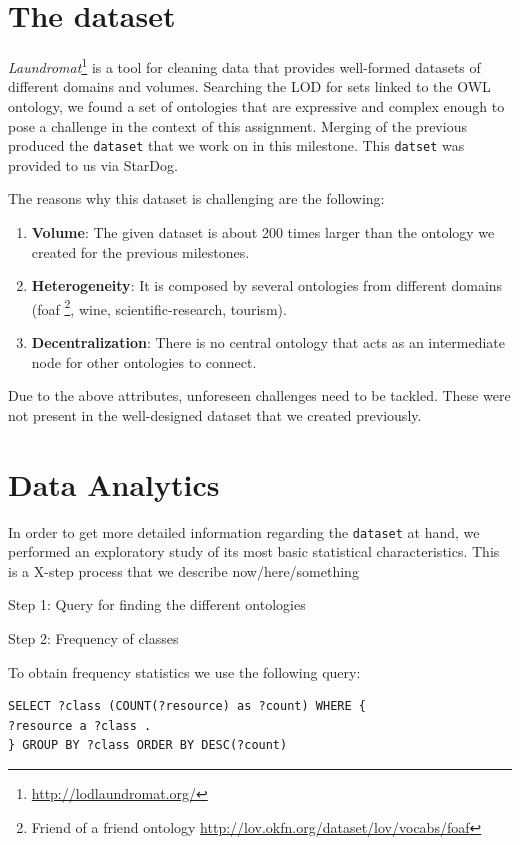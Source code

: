 \documentclass[runningheads,a4paper]{../../StyleFiles/llncs}
\begin{document}
\section{The dataset}
\textit{Laundromat}\footnote{\url{http://lodlaundromat.org/}} is a tool for cleaning data that provides well-formed datasets of different domains and volumes. Searching the LOD for sets linked to the OWL ontology, we found a set of ontologies that are expressive and complex enough to pose a challenge in the context of this assignment. Merging of the previous produced the \texttt{dataset} that we work on in this milestone. This \texttt{datset} was provided to us via StarDog. 

The reasons why this dataset is challenging are the following:

\begin{enumerate}
	\item \textbf{Volume}: The given dataset is about 200 times larger than the ontology we created for the previous milestones.
	\item \textbf{Heterogeneity}: It is composed by several ontologies from different domains (foaf \footnote{Friend of a friend ontology \url{http://lov.okfn.org/dataset/lov/vocabs/foaf}}, wine, scientific-research, tourism).
	\item \textbf{Decentralization}: There is no central ontology that acts as an intermediate node for other ontologies to connect.
\end{enumerate}

Due to the above attributes, unforeseen challenges need to be tackled. These were not present in the well-designed dataset that we created previously.

\section{Data Analytics}
In order to get more detailed information regarding the \texttt{dataset} at hand, we performed an exploratory study of its most basic statistical characteristics. This is a X-step process that we describe now/here/something %

Step 1: Query for finding the different ontologies

Step 2: Frequency of classes


To obtain frequency statistics we use the following query:

\begin{lstlisting}[captionpos=b, caption=SPARQL query for getting Event witSh Location, label=lst:sparql, basicstyle=\ttfamily\small,frame=bt]
SELECT ?class (COUNT(?resource) as ?count) WHERE {
?resource a ?class . 
} GROUP BY ?class ORDER BY DESC(?count)
\end{lstlisting}
\end{document}
